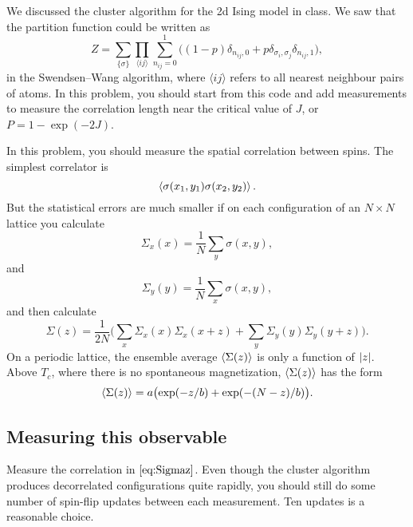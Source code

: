 We discussed the cluster algorithm for the 2d Ising model in class. We saw that the
partition function could be written as
%
\begin{equation}
    Z = \sum_{\{\sigma\}} \prod_{\langle i j \rangle} \sum_{n_{ij}=0}^1
    \bigl((1 - p) \delta_{n_{ij},0} + p \delta_{\sigma_i,\sigma_j} \delta_{n_{ij},1}\bigr),
\end{equation}
%
in the Swendsen--Wang algorithm,
where \(\langle i j \rangle\) refers to all nearest neighbour pairs of atoms.
In this problem, you should start from this code and add measurements to measure the
correlation length near the critical value of \(J\), or \(P=1 - \exp(-2J)\).

In this problem, you should measure the spatial correlation between spins. The simplest
correlator is
%
\begin{equation}
    \expval{ \sigma(x_1, y_1) \sigma(x_2, y_2) }.
\end{equation}
%
But the statistical errors are much smaller if on each configuration of an \(N \times N\)
lattice you calculate
%
\begin{equation}
    \Sigma_x(x) = \frac{ 1 }{ N } \sum_y \sigma(x, y),
\end{equation}
%
and
%
\begin{equation}
    \Sigma_y(y) = \frac{ 1 }{ N } \sum_x \sigma(x, y),
\end{equation}
%
and then calculate
%
\begin{equation}\label{eq:Sigmaz}
    \Sigma(z) = \frac{ 1 }{ 2N } \biggl( \sum_x \Sigma_x(x) \Sigma_x(x+z)
    + \sum_y \Sigma_y(y) \Sigma_y(y+z) \biggr).
\end{equation}
%
On a periodic lattice, the ensemble average \(\expval{\Sigma(z)}\) is only a
function of \(\abs{z}\). Above \(T_c\),
where there is no spontaneous magnetization, \(\expval{\Sigma(z)}\) has the form
%
\begin{equation}\label{eq:Sigmazbar}
    \expval{\Sigma(z)} = a \bigl(\exp(-z / b) + \exp(-(N - z) / b)\bigr).
\end{equation}

\subsection{Measuring this observable}

Measure the correlation in \(\eqref{eq:Sigmaz}\). Even
though the cluster algorithm produces decorrelated configurations quite rapidly, you should
still do some number of spin-flip updates between each measurement. Ten updates is a
reasonable choice.

